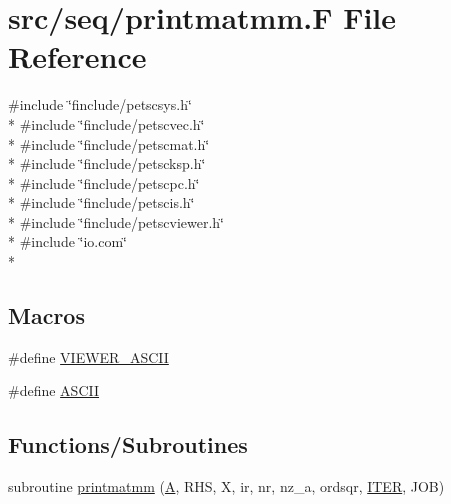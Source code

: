 \hypertarget{seq_2printmatmm_8_f}{\section{src/seq/printmatmm.F File Reference}
\label{seq_2printmatmm_8_f}
}
{\ttfamily \#include \char`\"{}finclude/petscsys.\-h\char`\"{}}\\*
{\ttfamily \#include \char`\"{}finclude/petscvec.\-h\char`\"{}}\\*
{\ttfamily \#include \char`\"{}finclude/petscmat.\-h\char`\"{}}\\*
{\ttfamily \#include \char`\"{}finclude/petscksp.\-h\char`\"{}}\\*
{\ttfamily \#include \char`\"{}finclude/petscpc.\-h\char`\"{}}\\*
{\ttfamily \#include \char`\"{}finclude/petscis.\-h\char`\"{}}\\*
{\ttfamily \#include \char`\"{}finclude/petscviewer.\-h\char`\"{}}\\*
{\ttfamily \#include \char`\"{}io.\-com\char`\"{}}\\*
\subsection*{Macros}
\begin{DoxyCompactItemize}
\item 
\#define \hyperlink{seq_2printmatmm_8_f_a37b9053035164bf12d78f6543776e413}{V\-I\-E\-W\-E\-R\-\_\-\-A\-S\-C\-I\-I}
\item 
\#define \hyperlink{seq_2printmatmm_8_f_a60710bac11b4f1135f61ded06542d661}{A\-S\-C\-I\-I}
\end{DoxyCompactItemize}
\subsection*{Functions/\-Subroutines}
\begin{DoxyCompactItemize}
\item 
subroutine \hyperlink{seq_2printmatmm_8_f_a6d69433a5976f1804547c9c3c5b589b8}{printmatmm} (\hyperlink{ibc2_8com_ad2108d58343608772fff791c23da58f5}{A}, R\-H\-S, X, ir, nr, nz\-\_\-a, ordsqr, \hyperlink{conv_8com_a5e8268d7a99a27a3889882b8cb685176}{I\-T\-E\-R}, J\-O\-B)
\end{DoxyCompactItemize}


